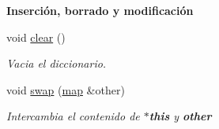 \begin{Indent}{\bf \-Inserción, borrado y modificación}
\begin{DoxyCompactItemize}
void \hyperlink{classaed2_1_1map_a2bfa5165825979bf2431db55bc6bc9ca_a2bfa5165825979bf2431db55bc6bc9ca}{clear} ()
\begin{DoxyCompactList}\small\item\em \-Vacia el diccionario. \end{DoxyCompactList}\item 
void \hyperlink{classaed2_1_1map_a43ddb71cc91e5c6021a7a1f243d6cc4a_a43ddb71cc91e5c6021a7a1f243d6cc4a}{swap} (\hyperlink{classaed2_1_1map}{map} \&other)
\begin{DoxyCompactList}\small\item\em \-Intercambia el contenido de {\bfseries $\ast$this} y {\bfseries other} \end{DoxyCompactList}\end{DoxyCompactItemize}
\end{Indent}
